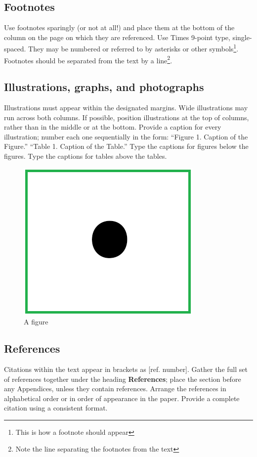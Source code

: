 \documentclass[10pt,twocolumn]{conference}
\begin{document}
\subsection{Footnotes}
\noindent
Use footnotes sparingly (or not at all!) and place them at the bottom of the column on the page on which they are referenced. Use Times 9-point type, single-spaced. They may be numbered or referred to by asterisks or other symbols\footnote{This is how a footnote should appear}. 
Footnotes should be separated from the text by a line\footnote{Note the line separating the footnotes from the text}.

\subsection{Illustrations, graphs, and photographs}
\noindent
Illustrations must appear within the designated margins. Wide illustrations may run across both columns. If possible, position illustrations at the top of columns, rather than in the middle or at the bottom.  Provide a caption for every illustration; number each one sequentially in the form: ``Figure 1. Caption of the Figure.'' ``Table 1. Caption of the Table.'' Type the captions for figures below the figures. Type the captions for tables above the tables. 
\begin{figure}[t]
\centering
\includegraphics{fig1.png}
\caption{A figure}
\end{figure}

\subsection{References}
\noindent
Citations within the text appear in brackets as [ref. number]. Gather the full set of references together under the heading {\bf References}; place the section before any Appendices, unless they contain references. Arrange the references in alphabetical order or in order of appearance in the paper. Provide a complete citation using a consistent format. 
\end{document}
